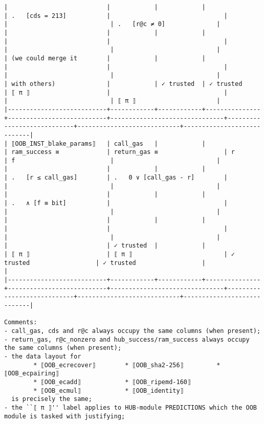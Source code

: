 \documentclass[varwidth=\maxdimen,margin=0.5cm,multi={verbatim}]{standalone}
\begin{document}
\begin{verbatim}
|                           |            |            |               | .   [cds = 213]           |                               |                            |                            | .   [r@c ≠ 0]              |
|                           |            |            |               |                           |                               |                            |                            |                            |
| (we could merge it        |            |            |               |                           |                               |                            |                            |                            |
| with others)              |            | ✓ trusted  | ✓ trusted     | ⟦ π ⟧                     |                               |                            |                            | ⟦ π ⟧                      |
|---------------------------+------------+------------+---------------+---------------------------+-------------------------------+----------------------------+----------------------------+----------------------------|
| ⟦OOB_INST_blake_params⟧   | call_gas   |            |               | ram_success ≡             | return_gas ≡                  | r                          | f                          |                            |
|                           |            |            |               | .   [r ≤ call_gas]        | .   0 ∨ [call_gas - r]        |                            |                            |                            |
|                           |            |            |               | .   ∧ [f ≡ bit]           |                               |                            |                            |                            |
|                           |            |            |               |                           |                               |                            |                            |                            |
|                           | ✓ trusted  |            |               | ⟦ π ⟧                     | ⟦ π ⟧                         | ✓ trusted                  | ✓ trusted                  |                            |
|---------------------------+------------+------------+---------------+---------------------------+-------------------------------+----------------------------+----------------------------+----------------------------|

Comments: 
- call_gas, cds and r@c always occupy the same columns (when present);
- return_gas, r@c_nonzero and hub_success/ram_success always occupy the same columns (when present);
- the data layout for
        * ⟦OOB_ecrecover⟧        * ⟦OOB_sha2-256⟧         * ⟦OOB_ecpairing⟧
        * ⟦OOB_ecadd⟧            * ⟦OOB_ripemd-160⟧                  
        * ⟦OOB_ecmul⟧            * ⟦OOB_identity⟧
  is precisely the same;
- the ``⟦ π ⟧'' label applies to HUB-module PREDICTIONS which the OOB module is tasked with justifying;


\end{verbatim}
\end{document}

